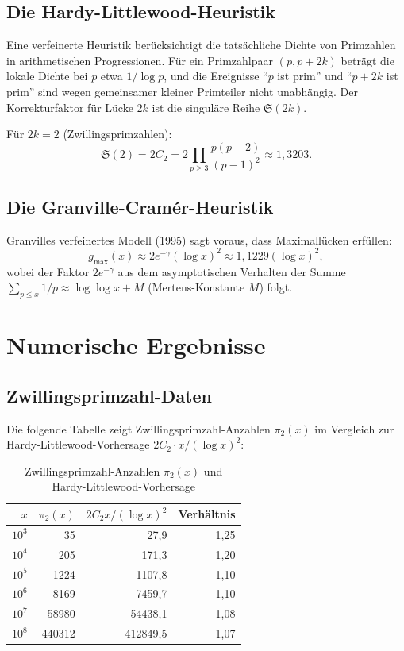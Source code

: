 \documentclass[12pt,a4paper]{amsart}
\theoremstyle{definition}
\begin{document}
\subsection{Die Hardy-Littlewood-Heuristik}

Eine verfeinerte Heuristik ber\"{u}cksichtigt die tats\"{a}chliche Dichte von
Primzahlen in arithmetischen Progressionen. F\"{u}r ein Primzahlpaar $(p, p+2k)$
betr\"{a}gt die lokale Dichte bei $p$ etwa $1/\log p$, und die Ereignisse
``$p$ ist prim'' und ``$p+2k$ ist prim'' sind wegen gemeinsamer kleiner
Primteiler nicht unabh\"{a}ngig. Der Korrekturfaktor f\"{u}r L\"{u}cke $2k$ ist die
singul\"{a}re Reihe $\mathfrak{S}(2k)$.

F\"{u}r $2k = 2$ (Zwillingsprimzahlen):
\[
  \mathfrak{S}(2) = 2 C_2 = 2 \prod_{p \geq 3} \frac{p(p-2)}{(p-1)^2} \approx 1{,}3203.
\]

\subsection{Die Granville-Cram\'{e}r-Heuristik}

Granvilles verfeinertes Modell (1995) sagt voraus, dass Maximall\"{u}cken erf\"{u}llen:
\[
  g_{\max}(x) \approx 2e^{-\gamma} (\log x)^2 \approx 1{,}1229 (\log x)^2,
\]
wobei der Faktor $2e^{-\gamma}$ aus dem asymptotischen Verhalten der Summe
$\sum_{p \leq x} 1/p \approx \log\log x + M$ (Mertens-Konstante $M$) folgt.

\section{Numerische Ergebnisse}

\subsection{Zwillingsprimzahl-Daten}

Die folgende Tabelle zeigt Zwillingsprimzahl-Anzahlen $\pi_2(x)$ im Vergleich
zur Hardy-Littlewood-Vorhersage $2C_2 \cdot x/(\log x)^2$:

\begin{table}[h]
\centering
\caption{Zwillingsprimzahl-Anzahlen $\pi_2(x)$ und Hardy-Littlewood-Vorhersage}
\begin{tabular}{@{}rrrr@{}}
\toprule
$x$ & $\pi_2(x)$ & $2C_2 x/(\log x)^2$ & Verh\"{a}ltnis \\
\midrule
$10^3$ & 35 & 27{,}9 & 1{,}25 \\
$10^4$ & 205 & 171{,}3 & 1{,}20 \\
$10^5$ & 1224 & 1107{,}8 & 1{,}10 \\
$10^6$ & 8169 & 7459{,}7 & 1{,}10 \\
$10^7$ & 58980 & 54438{,}1 & 1{,}08 \\
$10^8$ & 440312 & 412849{,}5 & 1{,}07 \\
\bottomrule
\end{tabular}
\end{table}
\end{document}
